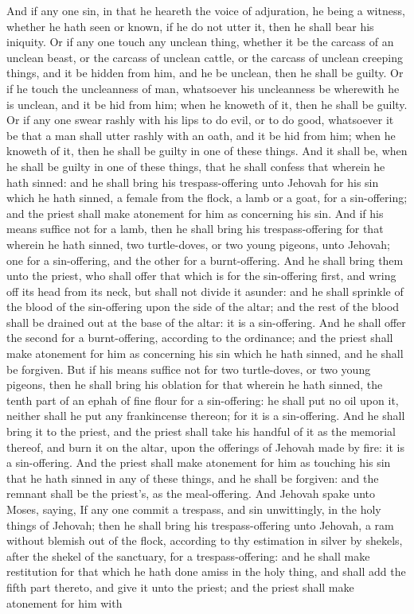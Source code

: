 And if any one sin, in that he heareth the voice of adjuration, he being a witness, whether he hath seen or known, if he do not utter it, then he shall bear his iniquity. Or if any one touch any unclean thing, whether it be the carcass of an unclean beast, or the carcass of unclean cattle, or the carcass of unclean creeping things, and it be hidden from him, and he be unclean, then he shall be guilty. Or if he touch the uncleanness of man, whatsoever his uncleanness be wherewith he is unclean, and it be hid from him; when he knoweth of it, then he shall be guilty. Or if any one swear rashly with his lips to do evil, or to do good, whatsoever it be that a man shall utter rashly with an oath, and it be hid from him; when he knoweth of it, then he shall be guilty in one of these things. And it shall be, when he shall be guilty in one of these things, that he shall confess that wherein he hath sinned: and he shall bring his trespass-offering unto Jehovah for his sin which he hath sinned, a female from the flock, a lamb or a goat, for a sin-offering; and the priest shall make atonement for him as concerning his sin.  And if his means suffice not for a lamb, then he shall bring his trespass-offering for that wherein he hath sinned, two turtle-doves, or two young pigeons, unto Jehovah; one for a sin-offering, and the other for a burnt-offering. And he shall bring them unto the priest, who shall offer that which is for the sin-offering first, and wring off its head from its neck, but shall not divide it asunder: and he shall sprinkle of the blood of the sin-offering upon the side of the altar; and the rest of the blood shall be drained out at the base of the altar: it is a sin-offering. And he shall offer the second for a burnt-offering, according to the ordinance; and the priest shall make atonement for him as concerning his sin which he hath sinned, and he shall be forgiven.  But if his means suffice not for two turtle-doves, or two young pigeons, then he shall bring his oblation for that wherein he hath sinned, the tenth part of an ephah of fine flour for a sin-offering: he shall put no oil upon it, neither shall he put any frankincense thereon; for it is a sin-offering. And he shall bring it to the priest, and the priest shall take his handful of it as the memorial thereof, and burn it on the altar, upon the offerings of Jehovah made by fire: it is a sin-offering. And the priest shall make atonement for him as touching his sin that he hath sinned in any of these things, and he shall be forgiven: and the remnant shall be the priest’s, as the meal-offering.  And Jehovah spake unto Moses, saying, If any one commit a trespass, and sin unwittingly, in the holy things of Jehovah; then he shall bring his trespass-offering unto Jehovah, a ram without blemish out of the flock, according to thy estimation in silver by shekels, after the shekel of the sanctuary, for a trespass-offering: and he shall make restitution for that which he hath done amiss in the holy thing, and shall add the fifth part thereto, and give it unto the priest; and the priest shall make atonement for him with 
